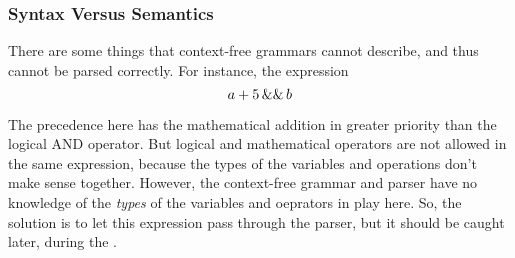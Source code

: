 \subsubsection{Syntax Versus Semantics}\label{subsubsec:LR_Syntax_vs_Semantics}
There are some things that context-free grammars cannot describe, and thus cannot be parsed correctly.
For instance, the expression
\begin{equation*}
  a + 5 \operatorname{\&\&} b
\end{equation*}

The precedence here has the mathematical addition in greater priority than the logical AND operator.
But logical and mathematical operators are not allowed in the same expression, because the types of the variables and operations don't make sense together.
However, the context-free grammar and parser have no knowledge of the \emph{types} of the variables and oeprators in play here.
So, the solution is to let this expression pass through the parser, but it should be caught later, during the .
